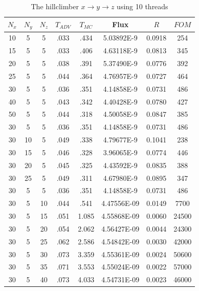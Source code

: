 \documentclass{article}
\begin{document}
\begin{table}
\begin{center}
\label{tbl_decay}
\caption{The hillclimber $x \rightarrow y \rightarrow z$ using 10 threads}
\begin{tabular}{|c|c|c|c|c|c|c|c|}
\hline
$N_x$ & $N_y$ & $N_z$ & $T_{ADV}$ & $T_{MC}$ & \textbf{Flux} & $R$ & $FOM$ \\ \hline
10 &  5 &  5 & .033 & .434 & 5.03892E-9  & 0.0918 & 254 \\ \hline
15 &  5 &  5 & .033 & .406 & 4.63118E-9  & 0.0813 & 345 \\ \hline
20 &  5 &  5 & .038 & .391 & 5.37490E-9  & 0.0776 & 392 \\ \hline
25 &  5 &  5 & .044 & .364 & 4.76957E-9  & 0.0727 & 464 \\ \hline
30 &  5 &  5 & .036 & .351 & 4.14858E-9  & 0.0731 & 486 \\ \hline
40 &  5 &  5 & .043 & .342 & 4.40428E-9  & 0.0780 & 427 \\ \hline
50 &  5 &  5 & .044 & .318 & 4.50058E-9  & 0.0847 & 385 \\ \hline \hline

30 &  5 & 5 & .036 & .351 & 4.14858E-9  & 0.0731 & 486 \\ \hline
30 & 10 & 5 & .049 & .338 & 4.79677E-9  & 0.1041 & 238 \\ \hline
30 & 15 & 5 & .046 & .328 & 3.96065E-9  & 0.0774 & 446 \\ \hline
30 & 20 & 5 & .045 & .325 & 4.43592E-9  & 0.0835 & 388 \\ \hline
30 & 25 & 5 & .049 & .311 & 4.67980E-9  & 0.0895 & 347 \\ \hline \hline

30 &  5 &  5 & .036 & .351 & 4.14858E-9  & 0.0731 & 486 \\ \hline
30 &  5 & 10 & .044 & .541 & 4.47556E-09  & 0.0149 & 7700 \\ \hline
30 &  5 & 15 & .051 & 1.085 & 4.55868E-09  & 0.0060 & 24500 \\ \hline
30 &  5 & 20 & .054 & 2.062 & 4.56427E-09  & 0.0044 & 24300 \\ \hline
30 &  5 & 25 & .062 & 2.586 & 4.54842E-09  & 0.0030 & 42000 \\ \hline
30 &  5 & 30 & .073 & 3.359 & 4.55361E-09  & 0.0024 & 50600 \\ \hline
30 &  5 & 35 & .071 & 3.553 & 4.55024E-09  & 0.0022 & 57000 \\ \hline
30 &  5 & 40 & .073 & 4.033 & 4.54731E-09  & 0.0023 & 46000 \\ \hline


\end{tabular}
\end{center}
\end{table}
\end{document}

